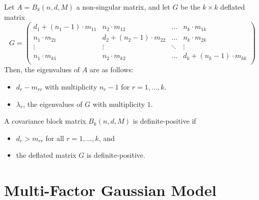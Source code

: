 \documentclass[11pt,fleqn]{book} %
\begin{document}
\begin{proposition}
	\label{prop1}
	Let $A = B_k(n, d, M)$ a non-singular matrix, and let $G$ be the $k {\times} k$ 
	deflated matrix
	\begin{displaymath}
		G =
		\left( \begin{array}{cccc}
		d_1+(n_1-1)\cdot m_{11} & n_2 \cdot m_{12}        & \dots  & n_k \cdot m_{1k} \\
		n_1\cdot m_{21}         & d_2+(n_2-1)\cdot m_{22} & \dots  & n_k \cdot m_{2k} \\
		\vdots                  & \vdots                  & \ddots & \vdots \\
		n_1\cdot m_{k1}         & n_2 \cdot m_{k2}        & \dots  & d_k+(n_k-1)\cdot m_{kk} \\
		\end{array} \right)
	\end{displaymath}
	Then, the eigenvalues of $A$ are as follows:
	\begin{itemize}
		\item $d_{r}-m_{rr}$ with multiplicity $n_r-1$ for $r=1,\dots,k$.
		\item $\lambda_r$, the eigenvalues of $G$ with multiplicity $1$.
	\end{itemize}
\end{proposition}

\begin{corollary}
	A covariance block matrix $B_k(n,d,M)$ is definite-positive if
	\begin{itemize}
		\item $d_r > m_{rr}$ for all $r=1,\dots,k$, and
		\item the deflated matrix $G$ is definite-positive.
	\end{itemize}
\end{corollary}

\section{Multi-Factor Gaussian Model}
\label{ap:mfgm}
\end{document}
